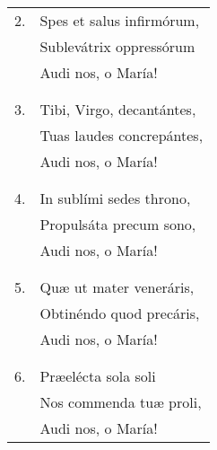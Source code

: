 \begin{longtable}{ll}
2. &Spes et salus infirmórum,\\
&Sublevátrix oppressórum\\
&Audi nos, o María!\\
\\\\
3. &Tibi, Virgo, decantántes,\\
&Tuas laudes concrepántes,\\
&Audi nos, o María!\\
\\\\
4. &In sublími sedes throno,\\
&Propulsáta precum sono,\\
&Audi nos, o María!\\
\\\\
5. &Quæ ut mater veneráris,\\
&Obtinéndo quod precáris,\\
&Audi nos, o María!\\
\\\\
6. &Præelécta sola soli\\
&Nos commenda tuæ proli,\\
&Audi nos, o María!
\end{longtable}
